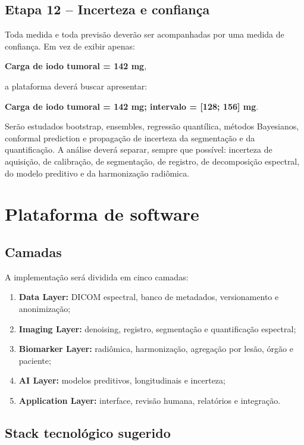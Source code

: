 \documentclass[11pt,a4paper]{article}
\begin{document}
\subsection{Etapa 12 -- Incerteza e confiança}

Toda medida e toda previsão deverão ser acompanhadas por uma medida de confiança. Em vez de exibir apenas:
\begin{center}
\textbf{Carga de iodo tumoral = 142 mg},
\end{center}
a plataforma deverá buscar apresentar:
\begin{center}
\textbf{Carga de iodo tumoral = 142 mg; intervalo = [128; 156] mg}.
\end{center}

Serão estudados bootstrap, ensembles, regressão quantílica, métodos Bayesianos, conformal prediction e propagação de incerteza da segmentação e da quantificação. A análise deverá separar, sempre que possível: incerteza de aquisição, de calibração, de segmentação, de registro, de decomposição espectral, do modelo preditivo e da harmonização radiômica.

\section{Plataforma de software}

\subsection{Camadas}

A implementação será dividida em cinco camadas:

\begin{enumerate}
\item \textbf{Data Layer:} DICOM espectral, banco de metadados, versionamento e anonimização;
\item \textbf{Imaging Layer:} denoising, registro, segmentação e quantificação espectral;
\item \textbf{Biomarker Layer:} radiômica, harmonização, agregação por lesão, órgão e paciente;
\item \textbf{AI Layer:} modelos preditivos, longitudinais e incerteza;
\item \textbf{Application Layer:} interface, revisão humana, relatórios e integração.
\end{enumerate}

\subsection{Stack tecnológico sugerido}
\end{document}

